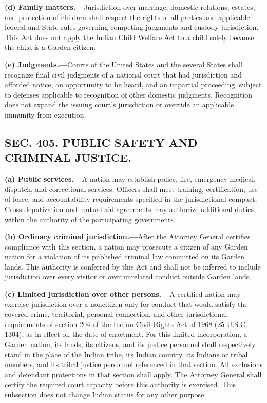 \documentclass[12pt,letterpaper]{article}
\begin{document}
\textbf{(d) Family matters.---}Jurisdiction over marriage, domestic relations, estates, and protection of children shall respect the rights of all parties and applicable federal and State rules governing competing judgments and custody jurisdiction. This Act does not apply the Indian Child Welfare Act to a child solely because the child is a Garden citizen.

\textbf{(e) Judgments.---}Courts of the United States and the several States shall recognize final civil judgments of a national court that had jurisdiction and afforded notice, an opportunity to be heard, and an impartial proceeding, subject to defenses applicable to recognition of other domestic judgments. Recognition does not expand the issuing court's jurisdiction or override an applicable immunity from execution.

\subsection*{SEC. 405. PUBLIC SAFETY AND CRIMINAL JUSTICE.}

\textbf{(a) Public services.---}A nation may establish police, fire, emergency medical, dispatch, and correctional services. Officers shall meet training, certification, use-of-force, and accountability requirements specified in the jurisdictional compact. Cross-deputization and mutual-aid agreements may authorize additional duties within the authority of the participating governments.

\textbf{(b) Ordinary criminal jurisdiction.---}After the Attorney General certifies compliance with this section, a nation may prosecute a citizen of any Garden nation for a violation of its published criminal law committed on its Garden lands. This authority is conferred by this Act and shall not be inferred to include jurisdiction over every visitor or over unrelated conduct outside Garden lands.

\textbf{(c) Limited jurisdiction over other persons.---}A certified nation may exercise jurisdiction over a noncitizen only for conduct that would satisfy the covered-crime, territorial, personal-connection, and other jurisdictional requirements of section 204 of the Indian Civil Rights Act of 1968 (25 U.S.C. 1304), as in effect on the date of enactment. For this limited incorporation, a Garden nation, its lands, its citizens, and its justice personnel shall respectively stand in the place of the Indian tribe, its Indian country, its Indians or tribal members, and its tribal justice personnel referenced in that section. All exclusions and defendant protections in that section shall apply. The Attorney General shall certify the required court capacity before this authority is exercised. This subsection does not change Indian status for any other purpose.
\end{document}
